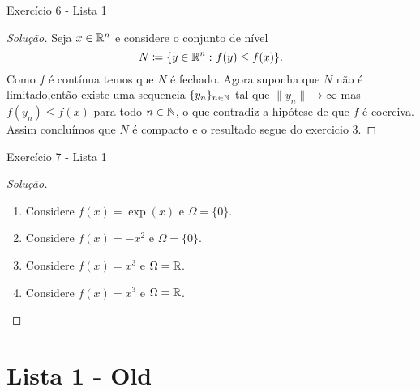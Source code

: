 \documentclass[12pt,twoside,a4paper]{article}
\begin{document}
\begin{problema}
Exercício 6 - Lista 1  
\end{problema}
\begin{proof}[Solução]
  Seja \(x\in\mathbb{R}^n\) e considere o conjunto de nível
  \[N\coloneqq\{y\in\mathbb{R}^n\,\colon f(y)\leq f(x)\}.\]
Como \(f\) é contínua temos que \(N\) é fechado. Agora suponha que
\(N\) não é limitado,então existe uma sequencia \(\{y_n\}_{n\in\mathbb{N}}\)
tal que \(\|y_n\|\rightarrow\infty\) mas \(f(y_n)\leq f(x)\) para
todo \(n\in\mathbb{N}\), o que contradiz a hipótese de que
\(f\) é coerciva. Assim concluímos que \(N\) é compacto e
o resultado segue do exercicio 3.
\end{proof}

\begin{problema}
Exercício 7 - Lista 1
\end{problema}
\begin{proof}[Solução]\hfill
  \begin{enumerate}
\item Considere \(f(x)=\exp(x)\) e \(\Omega=\{0\}\).
\item Considere \(f(x)=-x^2\) e \(\Omega=\{0\}\).
\item Considere \(f(x)=x^3\) e \(\Omega=\mathbb{R}\).
\item Considere \(f(x)=x^3\) e \(\Omega=\mathbb{R}\).\qedhere
\end{enumerate}
\end{proof}


\section{Lista 1 - Old}
\end{document}
